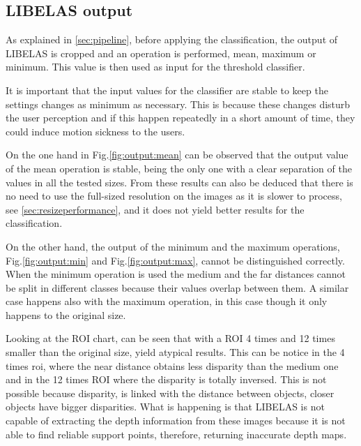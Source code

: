 \documentclass[10pt,a4paper,twocolumn,twoside]{article}
\begin{document}
	\subsection{LIBELAS output}
	\label{sec:libelasOutput}
	As explained in \ref{sec:pipeline}, before applying the classification, the output of LIBELAS is cropped and an operation is performed, mean, maximum or minimum. This value is then used as input for the threshold classifier.  
	
	It is important that the input values for the classifier are stable to keep the settings changes as minimum as necessary. This is because these changes disturb the user perception and if this happen repeatedly in a short amount of time, they could induce motion sickness to the users.  
	
	On the one hand in Fig.\ref{fig:output:mean} can be observed that the output value of the mean operation is stable, being the only one with a clear separation of the values in all the tested sizes. From these results can also be deduced that there is no need to use the full-sized resolution on the images as it is slower to process, see \ref{sec:resizeperformance}, and it does not yield better results for the classification. 
	
	On the other hand, the output of the minimum and the maximum operations, Fig.\ref{fig:output:min} and Fig.\ref{fig:output:max}, cannot be distinguished correctly. When the minimum operation is used the medium and the far distances cannot be split in different classes because their values overlap between them. A similar case happens also with the maximum operation, in this case though it only happens to the original size. %
	
	Looking at the ROI chart, can be seen that with a ROI 4 times and 12 times smaller than the original size, yield atypical results. This can be notice in the 4 times roi, where the near distance obtains less disparity than the medium one and in the 12 times ROI where the disparity is totally inversed. This is not possible because disparity, is linked with the distance between objects, closer objects have bigger disparities. What is happening is that LIBELAS is not capable of extracting the depth information from these images because it is not able to find reliable support points, therefore, returning inaccurate depth maps. 
\end{document}
